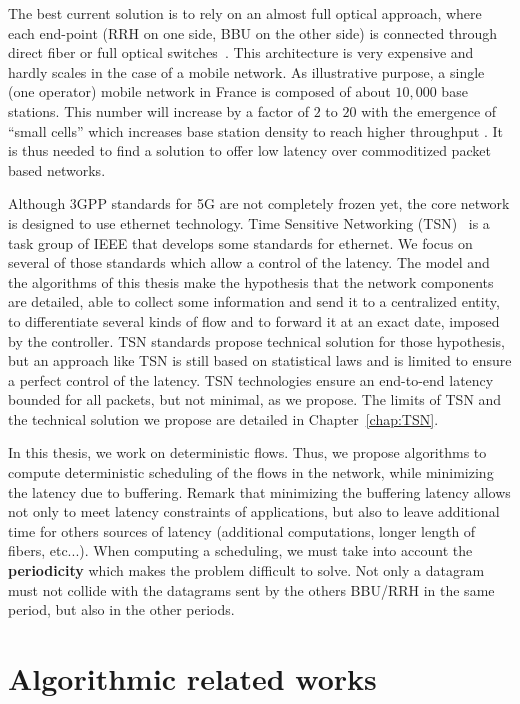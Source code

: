 The best current solution is to rely on an almost full optical approach, where each end-point (RRH on one side, BBU on the other side) is connected through direct fiber or full optical switches~\cite{pizzinat2015things,tayq2017real}. This architecture is very expensive and hardly scales in the case of a mobile network. As illustrative purpose, a single (one operator) mobile network in France is composed of about $10,000$ base stations. This number will increase by a factor of $2$ to $20$ with the emergence of “small cells” which increases base station density to reach higher throughput \cite{leclerc2016transmission,leclerc2016signaling}. It is thus needed to find a solution to offer low latency over commoditized packet based networks. 

Although 3GPP standards for 5G are not completely frozen yet, the core network is designed to use ethernet technology. Time Sensitive Networking (TSN)~\cite{ieee802,ieeep802} is a task group of IEEE that develops some standards for ethernet. We focus on several of those standards which allow a control of the latency.
 The model and the algorithms of this thesis make the hypothesis that the network components are detailed, able to collect some information and send it to a centralized entity, to differentiate several kinds of flow and to forward it at an exact date, imposed by the controller. TSN standards propose technical solution for those hypothesis, but an approach like TSN is still based on statistical laws and is limited to ensure a perfect control of the latency. TSN technologies ensure an end-to-end latency bounded for all packets, but not minimal, as we propose. The limits of TSN and the technical solution we propose are detailed in Chapter~\ref{chap:TSN}.

 In this thesis, we work on deterministic flows. Thus, we propose algorithms to compute deterministic scheduling of the flows in the network, while minimizing the latency due to buffering. Remark that minimizing the buffering latency allows not only to meet latency constraints of applications, but also to leave additional time for others sources of latency (additional computations, longer length of fibers, etc...). When computing a scheduling, we must take into account the \textbf{periodicity} which makes the problem difficult to solve. Not only a datagram must not collide with the datagrams sent by the others BBU/RRH in the same period, but also in the other periods.



\section{Algorithmic related works}
 
